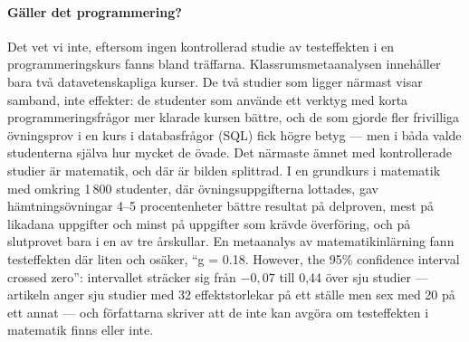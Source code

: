 \paragraph{Gäller det programmering?}
Det vet vi inte, eftersom ingen kontrollerad studie av testeffekten i
en programmeringskurs fanns bland träffarna.  Klassrumsmetaanalysen
innehåller bara två datavetenskapliga kurser\autocite{Yang2021Testing}.
De två studier som ligger närmast visar samband, inte effekter: de
studenter som använde ett verktyg med korta programmeringsfrågor mer
klarade kursen bättre\autocite{Alzaid2017BiteSize}, och de som gjorde
fler frivilliga övningsprov i en kurs i databasfrågor (SQL) fick högre
betyg\autocite{Wojtowicz2025SQL} --- men i båda valde studenterna själva
hur mycket de övade.  Det närmaste ämnet med kontrollerade studier är
matematik, och där är bilden splittrad.  I en grundkurs i matematik med
omkring 1\,800 studenter, där övningsuppgifterna lottades, gav
hämtningsövningar 4--5 procentenheter bättre resultat på delproven,
mest på likadana uppgifter och minst på uppgifter som krävde överföring,
och på slutprovet bara i en av tre årskullar\autocite{Schwerter2026Gateway}.
En metaanalys av matematikinlärning fann testeffekten där liten och
osäker, \enquote{g = 0.18. However, the 95\% confidence interval crossed
zero}\autocite[1]{Murray2025Mathematics}: intervallet sträcker sig från
\(-0{,}07\) till 0,44 över sju studier --- artikeln anger sju studier med
32 effektstorlekar på ett ställe men sex med 20 på ett
annat\autocite[16, 21]{Murray2025Mathematics} --- och författarna skriver
att de inte kan avgöra om testeffekten i matematik finns eller
inte\autocite[17, 22]{Murray2025Mathematics}.

